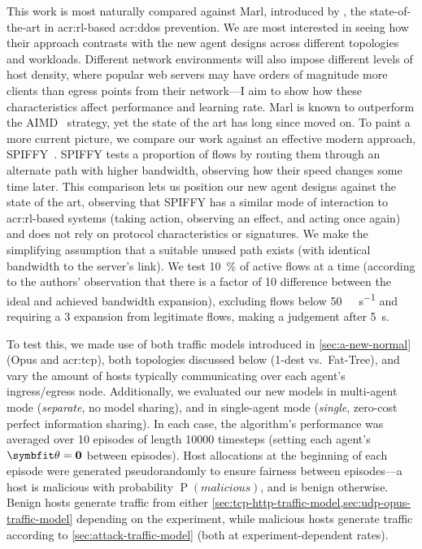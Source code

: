 
This work is most naturally compared against Marl, introduced by \textcite{DBLP:journals/eaai/MalialisK15}, the state-of-the-art in \gls{acr:rl}-based \gls{acr:ddos} prevention.
We are most interested in seeing how their approach contrasts with the new agent designs across different topologies and workloads.
Different network environments will also impose different levels of host density, where popular web servers may have orders of magnitude more clients than egress points from their network---I aim to show how these characteristics affect performance and learning rate.
Marl is known to outperform the AIMD~\parencite{DBLP:journals/ton/YauLLY05} strategy, yet the state of the art has long since moved on.
To paint a more current picture, we compare our work against an effective modern approach, SPIFFY~\parencite{DBLP:conf/ndss/KangGS16}.
SPIFFY tests a proportion of flows by routing them through an alternate path with higher bandwidth, observing how their speed changes some time later.
This comparison lets us position our new agent designs against the state of the art, observing that SPIFFY has a similar mode of interaction to \gls{acr:rl}-based systems (taking action, observing an effect, and acting once again) and does not rely on protocol characteristics or signatures.
We make the simplifying assumption that a suitable unused path exists (with identical bandwidth to the server's link).
We test \qty{10}{\percent} of active flows at a time (according to the authors' observation that there is a factor of \qty{10}{\times} difference between the ideal and achieved bandwidth expansion), excluding flows below \qty{50}{\kilo\bit\per\second} and requiring a \qty{3}{\times} expansion from legitimate flows, making a judgement after \qty{5}{\second}.

To test this, we made use of both traffic models introduced in \cref{sec:a-new-normal} (Opus and \gls{acr:tcp}), both topologies discussed below (1-dest vs.\ Fat-Tree), and vary the amount of hosts typically communicating over each agent's ingress/egress node.
Additionally, we evaluated our new models in multi-agent mode (\emph{separate}, no model sharing), and in single-agent mode (\emph{single}, zero-cost perfect information sharing).
In each case, the algorithm's performance was averaged over \num{10} episodes of length \num{10000} timesteps (setting each agent's $\wvec{}=\mathbf{0}$ between episodes).
Host allocations at the beginning of each episode were generated pseudorandomly to ensure fairness between episodes---a host is malicious with probability $\operatorname{P}\left(\mathit{malicious}\right)$, and is benign otherwise.
Benign hosts generate traffic from either \cref{sec:tcp-http-traffic-model,sec:udp-opus-traffic-model} depending on the experiment, while malicious hosts generate traffic according to \cref{sec:attack-traffic-model} (both at experiment-dependent rates).


